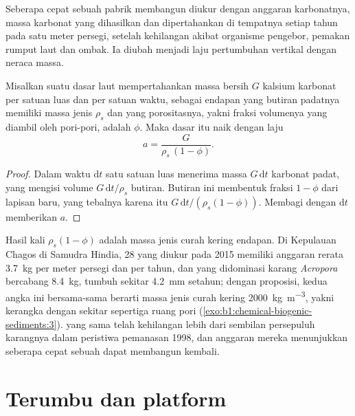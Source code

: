 Seberapa cepat sebuah pabrik membangun diukur dengan anggaran karbonatnya, massa karbonat yang dihasilkan dan dipertahankan di tempatnya setiap tahun pada satu meter persegi, setelah kehilangan akibat organisme pengebor, pemakan rumput laut dan ombak. Ia diubah menjadi laju pertumbuhan vertikal dengan neraca massa.

\begin{proposition}\label{prop:b1:chemical-biogenic-sediments:accretion}
Misalkan suatu dasar laut mempertahankan massa bersih $G$ kalsium karbonat per satuan luas dan per satuan waktu, sebagai endapan yang butiran padatnya memiliki massa jenis $\rho_s$ dan yang porositasnya, yakni fraksi volumenya yang diambil oleh pori-pori, adalah $\phi$. Maka dasar itu naik dengan laju
\[
a = \frac{G}{\rho_s\,(1-\phi)}.
\]
\end{proposition}

\begin{proof}
Dalam waktu $\mathrm dt$ satu satuan luas menerima massa $G\,\mathrm dt$ karbonat padat, yang mengisi volume $G\,\mathrm dt/\rho_s$ butiran. Butiran ini membentuk fraksi $1-\phi$ dari lapisan baru, yang tebalnya karena itu $G\,\mathrm dt/(\rho_s(1-\phi))$. Membagi dengan $\mathrm dt$ memberikan $a$.
\end{proof}

Hasil kali $\rho_s(1-\phi)$ adalah massa jenis curah kering endapan. Di  Kepulauan Chagos di Samudra Hindia, 28  yang diukur pada 2015 memiliki anggaran rerata \qty{3.7}{kg}  per meter persegi dan per tahun, dan yang didominasi karang \emph{Acropora} bercabang \qty{8.4}{kg}, tumbuh sekitar \qty{4.2}{mm} setahun; dengan proposisi, kedua angka ini bersama-sama berarti massa jenis curah kering \qty{2000}{kg.m^{-3}}, yakni kerangka  dengan sekitar sepertiga ruang pori (\cref{exo:b1:chemical-biogenic-sediments:3}).  yang sama telah kehilangan lebih dari sembilan persepuluh karangnya dalam peristiwa pemanasan 1998, dan anggaran mereka menunjukkan seberapa cepat sebuah  dapat membangun kembali.

\section{Terumbu dan platform}\label{sec:b1:chemical-biogenic-sediments:reefs}

